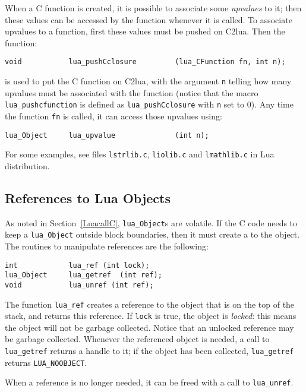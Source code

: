 When a C function is created,
it is possible to associate some \emph{upvalues} to it;
then these values can be accessed by the function whenever it is called.
To associate upvalues to a function,
first these values must be pushed on C2lua.
Then the function:
\begin{verbatim}
void           lua_pushCclosure         (lua_CFunction fn, int n);
\end{verbatim}
is used to put the C function on C2lua,
with the argument \verb|n| telling how many upvalues must be
associated with the function
(notice that the macro \verb|lua_pushcfunction| is defined as
\verb|lua_pushCclosure| with \verb|n| set to 0).
Any time the function \verb|fn| is called,
it can access those upvalues using:
\begin{verbatim}
lua_Object     lua_upvalue              (int n);
\end{verbatim}

For some examples, see files \verb|lstrlib.c|,
\verb|liolib.c| and \verb|lmathlib.c| in Lua distribution.

\subsection{References to Lua Objects}

As noted in Section~\ref{LuacallC}, \verb|lua_Object|s are volatile.
If the C code needs to keep a \verb|lua_Object|
outside block boundaries,
then it must create a  to the object.
The routines to manipulate references are the following:
\begin{verbatim}
int            lua_ref (int lock);
lua_Object     lua_getref  (int ref);
void           lua_unref (int ref);
\end{verbatim}
The function \verb|lua_ref| creates a reference
to the object that is on the top of the stack,
and returns this reference.
If \verb|lock| is true, the object is \emph{locked}:
this means the object will not be garbage collected.
Notice that an unlocked reference may be garbage collected.
Whenever the referenced object is needed,
a call to \verb|lua_getref|
returns a handle to it;
if the object has been collected,
\verb|lua_getref| returns \verb|LUA_NOOBJECT|.

When a reference is no longer needed,
it can be freed with a call to \verb|lua_unref|.



